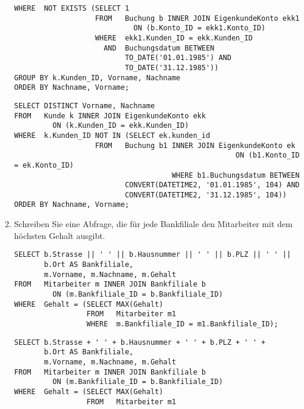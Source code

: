 \begin{enumerate}
\begin{lstlisting}[language=oracle_sql]
WHERE  NOT EXISTS (SELECT 1
                   FROM   Buchung b INNER JOIN EigenkundeKonto ekk1
                            ON (b.Konto_ID = ekk1.Konto_ID)
                   WHERE  ekk1.Kunden_ID = ekk.Kunden_ID
                     AND  Buchungsdatum BETWEEN
                          TO_DATE('01.01.1985') AND
                          TO_DATE('31.12.1985'))
GROUP BY k.Kunden_ID, Vorname, Nachname
ORDER BY Nachname, Vorname;
        \end{lstlisting}
        \begin{mssql}[\FALSE]
        \end{mssql}
        \begin{lstlisting}[language=ms_sql]
SELECT DISTINCT Vorname, Nachname
FROM   Kunde k INNER JOIN EigenkundeKonto ekk
         ON (k.Kunden_ID = ekk.Kunden_ID)
WHERE  k.Kunden_ID NOT IN (SELECT ek.kunden_id
                   FROM   Buchung b1 INNER JOIN EigenkundeKonto ek
													ON (b1.Konto_ID = ek.Konto_ID)
									 WHERE b1.Buchungsdatum BETWEEN
                          CONVERT(DATETIME2, '01.01.1985', 104) AND
                          CONVERT(DATETIME2, '31.12.1985', 104))
ORDER BY Nachname, Vorname;
        \end{lstlisting}
        \item Schreiben Sie eine Abfrage, die für jede Bankfiliale den
        Mitarbeiter mit dem höchsten Gehalt ausgibt.
        \begin{oraclesql}[\FALSE]
        \end{oraclesql}
        \begin{lstlisting}[language=oracle_sql]
SELECT b.Strasse || ' ' || b.Hausnummer || ' ' || b.PLZ || ' ' ||
       b.Ort AS Bankfiliale,
       m.Vorname, m.Nachname, m.Gehalt
FROM   Mitarbeiter m INNER JOIN Bankfiliale b
         ON (m.Bankfiliale_ID = b.Bankfiliale_ID)
WHERE  Gehalt = (SELECT MAX(Gehalt)
                 FROM   Mitarbeiter m1
                 WHERE  m.Bankfiliale_ID = m1.Bankfiliale_ID);
        \end{lstlisting}
\clearpage
        \begin{mssql}[\FALSE]
        \end{mssql}
        \begin{lstlisting}[language=ms_sql]
SELECT b.Strasse + ' ' + b.Hausnummer + ' ' + b.PLZ + ' ' +
       b.Ort AS Bankfiliale,
       m.Vorname, m.Nachname, m.Gehalt
FROM   Mitarbeiter m INNER JOIN Bankfiliale b
         ON (m.Bankfiliale_ID = b.Bankfiliale_ID)
WHERE  Gehalt = (SELECT MAX(Gehalt)
                 FROM   Mitarbeiter m1

\end{lstlisting}
\end{enumerate}
